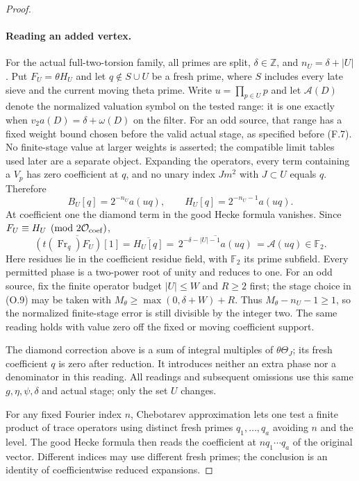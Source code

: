 \begin{proof}
\paragraph{Reading an added vertex.}
For the actual full-two-torsion family, all primes are split,
$\delta\in\mathbb Z$, and $n_U=\delta+|U|$.  Put $F_U=\theta H_U$
and let $q\notin S\cup U$ be a fresh prime, where $S$ includes
every late sieve and the current moving theta prime.
Write $u=\prod_{p\in U}p$ and let $\mathcal A(D)$ denote the
normalized valuation symbol on the tested range: it is one exactly when
$v_2a(D)=\delta+\omega(D)$ on the filter. For an odd source, that
range has a fixed weight bound chosen before the valid actual stage,
as specified before (F.7). No finite-stage value at larger weights is
asserted; the compatible limit tables used later are a separate object.
Expanding the operators, every term containing a $V_p$ has zero
coefficient at $q$, and no unary index $Jm^2$ with $J\subset U$
equals $q$.  Therefore
\[
 B_U[q]=2^{-n_U}a(uq),\qquad
 H_U[q]=2^{-n_U-1}a(uq).
\]
At coefficient one the diamond term in the good Hecke formula
vanishes.  Since $F_U\equiv H_U\pmod{2\mathcal O_{\rm coef}}$,
\[
 \overline{(t(\operatorname{Fr}_q)F_U)[1]}
   =\overline{H_U[q]}
   =\overline{\,2^{-\delta-|U|-1}a(uq)\,}
   =\mathcal A(uq)\in\mathbb F_2.
\]
Here residues lie in the coefficient residue field, with
$\mathbb F_2$ its prime subfield.  Every permitted phase is a
two-power root of unity and reduces to one.  For an odd source,
fix the finite operator budget $|U|\le W$ and $R\ge2$ first;
the stage choice in (O.9) may be taken with
$M_\theta\ge\max(0,\delta+W)+R$.
Thus $M_\theta-n_U-1\ge1$, so the normalized finite-stage error
is still divisible by the integer two.  The same reading holds
with value zero off the fixed or moving coefficient support.

The diamond correction above is a sum of integral multiples of
$\theta\Theta_J$; its fresh coefficient $q$ is zero after reduction.
It introduces neither an extra phase nor a denominator in this
reading.  All readings and subsequent omissions use this same
$g,\eta,\psi,\delta$ and actual stage; only the set $U$ changes.

For any fixed Fourier index $n$, Chebotarev approximation lets one
test a finite product of trace operators using distinct fresh primes
$q_1,\ldots,q_a$ avoiding $n$ and the level. The good Hecke formula
then reads the coefficient at $nq_1\cdots q_a$ of the original vector.
Different indices may use different fresh primes; the conclusion is
an identity of coefficientwise reduced expansions.


\end{proof}

